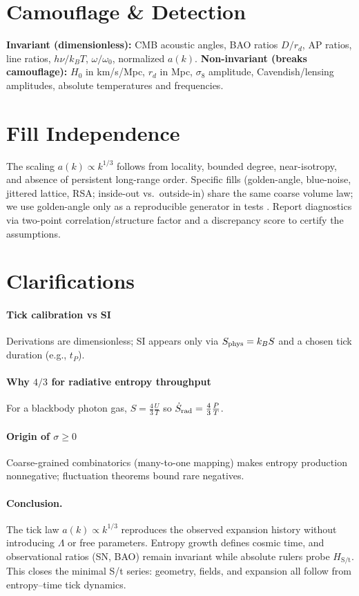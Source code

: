 \section*{Camouflage \& Detection}
\textbf{Invariant (dimensionless):} CMB acoustic angles, BAO ratios $D/r_d$, AP ratios, line ratios, $h\nu/k_BT$, $\omega/\omega_0$, normalized $a(k)$.
\textbf{Non-invariant (breaks camouflage):} $H_0$ in km/s/Mpc, $r_d$ in Mpc, $\sigma_8$ amplitude, Cavendish/lensing amplitudes, absolute temperatures and frequencies.

\section*{Fill Independence}
The scaling $a(k)\propto k^{1/3}$ follows from locality, bounded degree, near-isotropy, and absence of persistent long-range order.
Specific fills (golden-angle, blue-noise, jittered lattice, RSA; inside-out vs.\ outside-in) share the same coarse volume law; we use golden-angle only as a reproducible generator in tests \cite{livio2002golden,jean1994phyllotaxis}.
Report diagnostics via two-point correlation/structure factor and a discrepancy score to certify the assumptions.


\section*{Clarifications}
\paragraph{Tick calibration vs SI}
Derivations are dimensionless; SI appears only via \(S_{\rm phys}=k_B S\) and a chosen tick duration (e.g., \(t_P\)).
\paragraph{Why \(4/3\) for radiative entropy throughput}
For a blackbody photon gas, \(S=\frac{4}{3}\frac{U}{T}\) so \(\dot S_{\rm rad}=\frac{4}{3}\frac{P}{T}\).
\paragraph{Origin of \(\sigma\ge 0\)}
Coarse-grained combinatorics (many-to-one mapping) makes entropy production nonnegative; fluctuation theorems bound rare negatives.


\paragraph{Conclusion.}
The tick law $a(k)\propto k^{1/3}$ reproduces the observed expansion history without introducing $\Lambda$ or free parameters. Entropy growth defines cosmic time, and observational ratios (SN, BAO) remain invariant while absolute rulers probe $H_{\text{S/t}}$. This closes the minimal S/t series: geometry, fields, and expansion all follow from entropy--time tick dynamics.